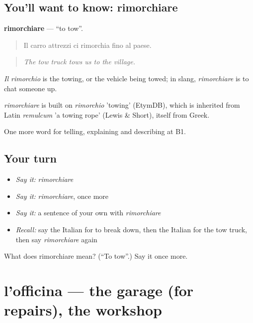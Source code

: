 \subsection*{You'll want to know: rimorchiare}
\textbf{rimorchiare} — \textquotedblleft{}to tow\textquotedblright{}.

\begin{quote}
Il carro attrezzi ci rimorchia fino al paese.
\end{quote}

\begin{quote}
\emph{The tow truck tows us to the village.}
\end{quote}

\emph{Il rimorchio} is the towing, or the vehicle being towed; in slang, \emph{rimorchiare} is to chat someone up.

\begin{cousinweb}
\emph{rimorchiare} is built on \emph{rimorchio} 'towing' (EtymDB), which is inherited from Latin \emph{remulcum} 'a towing rope' (Lewis \& Short), itself from Greek.
\end{cousinweb}

\begin{grammarlens}[title={What you've built}]
One more word for telling, explaining and describing at B1.
\end{grammarlens}

\subsection*{Your turn}
\begin{itemize}
\raggedright
  \item \emph{Say it:} \emph{rimorchiare}
  \item \emph{Say it:} \emph{rimorchiare}, once more
  \item \emph{Say it:} a sentence of your own with \emph{rimorchiare}
  \item \emph{Recall:} say the Italian for to break down, then the Italian for the tow truck, then say \emph{rimorchiare} again
\end{itemize}

\begin{tcolorbox}[breakable,colback=teal!4,colframe=teal!35!black,title={Before you move on}]
What does rimorchiare mean? (\textquotedblleft{}To tow\textquotedblright{}.) Say it once more.
\end{tcolorbox}
\section[l'officina]{l'officina — the garage (for repairs), the workshop}

